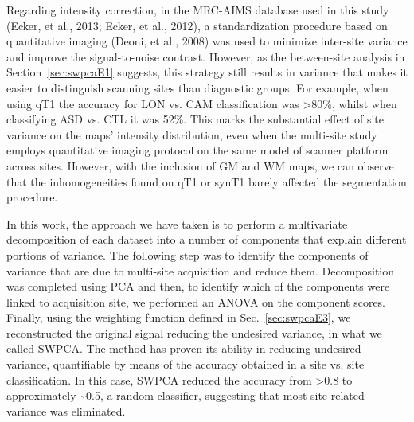 Regarding intensity correction, in the \ac{MRC-AIMS} database used in this
study (Ecker, et al., 2013; Ecker, et al., 2012), a standardization
procedure based on quantitative imaging (Deoni, et al., 2008) was used
to minimize inter-site variance and improve the signal-to-noise
contrast. However, as the between-site analysis in Section~\ref{sec:swpcaE1}
suggests, this strategy still results in variance that makes it easier
to distinguish scanning sites than diagnostic groups. For example, when
using \ac{qT1} the accuracy for LON vs. CAM classification was
{\textgreater}80\%, whilst when classifying \ac{ASD} vs. CTL it was 52\%.
This marks the substantial effect of site variance on the maps’
intensity distribution, even when the multi-site study employs
quantitative imaging protocol on the same model of scanner platform
across sites. However, with the inclusion of \ac{GM} and \ac{WM} maps, we can
observe that the inhomogeneities found on \ac{qT1} or \ac{synT1} barely affected
the segmentation procedure. 


In this work, the approach we have taken is to perform a multivariate
decomposition of each dataset into a number of components that explain
different portions of variance. The following step was to identify the
components of variance that are due to multi-site acquisition and
reduce them. Decomposition was completed using \ac{PCA} and then, to
identify which of the components were linked to acquisition site, we
performed an ANOVA on the component scores. Finally, using the
weighting function defined in Sec.~\ref{sec:swpcaE3}, we reconstructed the original
signal reducing the undesired variance, in what we called \ac{SWPCA}. The method has proven its ability in reducing
undesired variance, quantifiable by means of the accuracy obtained in a
site vs. site classification. In this case, \ac{SWPCA} reduced the accuracy
from {\textgreater}0.8 to approximately \~{}0.5, a random classifier,
suggesting that most site-related variance was eliminated. 



